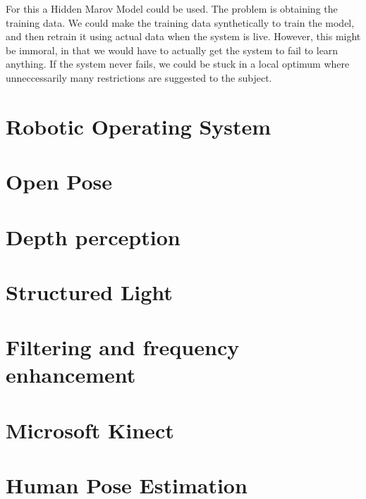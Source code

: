 For this a Hidden Marov Model could be used. The problem is obtaining the training data.
We could make the training data synthetically to train the model, and then retrain it using actual data when the system is live. However, this might be immoral, in that we would have to actually get the system to fail to learn anything. If the system never fails, we could be stuck in a local optimum where unneccessarily many restrictions are suggested to the subject.

\section{Robotic Operating System}

\section{Open Pose}

\section{Depth perception}

\section{Structured Light}

\section{Filtering and frequency enhancement}

\section{Microsoft Kinect}

\section{Human Pose Estimation}



